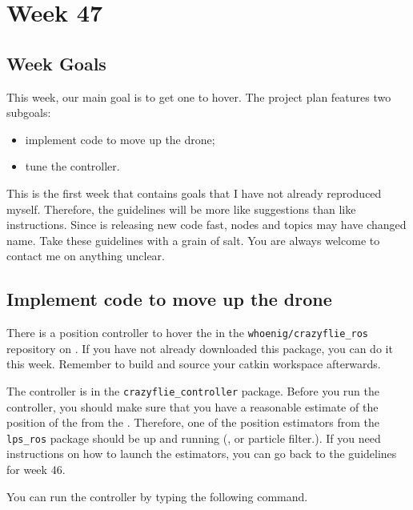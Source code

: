 \chapter*{Week 47}





\section*{Week Goals}

This week, our main goal is to get one \CF{} to hover.
The project plan features two subgoals:
\begin{itemize}
  \item implement \ROS{} code to move up the drone;
  \item tune the \PID{} controller.
\end{itemize}
This is the first week that contains goals that I have not already reproduced myself.
Therefore, the guidelines will be more like suggestions than like instructions.
Since \Bitcraze{} is releasing new code fast, nodes and topics may have changed name.
Take these guidelines with a grain of salt.
You are always welcome to contact me on anything unclear.







\section*{Implement \ROS{} code to move up the drone}

There is a \PID{} position controller to hover the \CF{} in the \lstinline|whoenig/crazyflie_ros| repository on  \Github{}.
If you have not already downloaded this package, you can do it this week.
Remember to build and source your catkin workspace afterwards.

The \PID{} controller is in the \lstinline|crazyflie_controller| package.
Before you run the controller, you should make sure that you have a reasonable estimate of the position of the \CF{} from the \LPS{}.
Therefore, one of the position estimators from the \lstinline|lps_ros| package should be up and running (\EKF{}, \LMS{} or particle filter.).
If you need instructions on how to launch the estimators, you can go back to the guidelines for week 46.

You can run the \PID{} controller by typing the following command.


